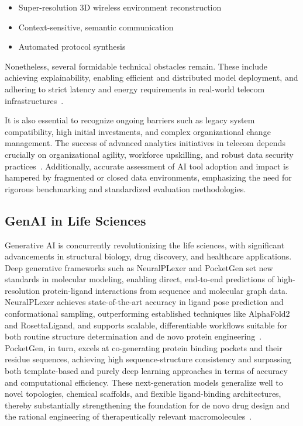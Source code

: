 \documentclass[sigconf]{acmart}
\begin{document}
\begin{itemize}
    \item Super-resolution 3D wireless environment reconstruction
    \item Context-sensitive, semantic communication
    \item Automated protocol synthesis
\end{itemize}

Nonetheless, several formidable technical obstacles remain. These include achieving explainability, enabling efficient and distributed model deployment, and adhering to strict latency and energy requirements in real-world telecom infrastructures~\cite{ref8,ref15}.

It is also essential to recognize ongoing barriers such as legacy system compatibility, high initial investments, and complex organizational change management. The success of advanced analytics initiatives in telecom depends crucially on organizational agility, workforce upskilling, and robust data security practices~\cite{ref19}. Additionally, accurate assessment of AI tool adoption and impact is hampered by fragmented or closed data environments, emphasizing the need for rigorous benchmarking and standardized evaluation methodologies.

\subsection{GenAI in Life Sciences}

Generative AI is concurrently revolutionizing the life sciences, with significant advancements in structural biology, drug discovery, and healthcare applications. Deep generative frameworks such as NeuralPLexer and PocketGen set new standards in molecular modeling, enabling direct, end-to-end predictions of high-resolution protein-ligand interactions from sequence and molecular graph data. NeuralPLexer achieves state-of-the-art accuracy in ligand pose prediction and conformational sampling, outperforming established techniques like AlphaFold2 and RosettaLigand, and supports scalable, differentiable workflows suitable for both routine structure determination and de novo protein engineering~\cite{ref4}. PocketGen, in turn, excels at co-generating protein binding pockets and their residue sequences, achieving high sequence-structure consistency and surpassing both template-based and purely deep learning approaches in terms of accuracy and computational efficiency. These next-generation models generalize well to novel topologies, chemical scaffolds, and flexible ligand-binding architectures, thereby substantially strengthening the foundation for de novo drug design and the rational engineering of therapeutically relevant macromolecules~\cite{ref5}.
\end{document}
